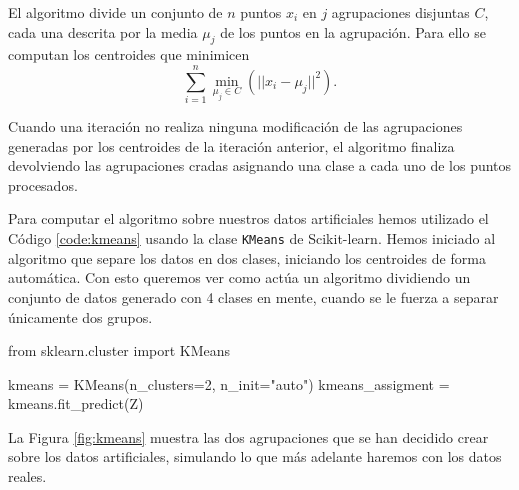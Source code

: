 El algoritmo divide un conjunto de $ n $ puntos $ x_i $ en $ j $ agrupaciones disjuntas $ C $, cada una descrita por la media $ \mu_j $ de los puntos en la agrupación. Para ello se computan los centroides que minimicen
\begin{equation}
  \sum\limits_{i=1}^n \underset{\mu_j \in C}{\operatorname{min}} (|| x_i - \mu_j||^2).
\end{equation}

Cuando una iteración no realiza ninguna modificación de las agrupaciones generadas por los centroides de la iteración anterior, el algoritmo finaliza devolviendo las agrupaciones cradas asignando una clase a cada uno de los puntos procesados.

Para computar el algoritmo sobre nuestros datos artificiales hemos utilizado el Código \ref{code:kmeans} usando la clase \texttt{KMeans} de Scikit-learn. Hemos iniciado al algoritmo que separe los datos en dos clases, iniciando los centroides de forma automática. Con esto queremos ver como actúa un algoritmo dividiendo un conjunto de datos generado con 4 clases en mente, cuando se le fuerza a separar únicamente dos grupos.

\begin{mypython}[float={h}, caption={k-medias.}, label={code:kmeans}]
  from sklearn.cluster import KMeans

  kmeans = KMeans(n_clusters=2, n_init="auto")
  kmeans_assigment = kmeans.fit_predict(Z)
\end{mypython}

La Figura \ref{fig:kmeans} muestra las dos agrupaciones que se han decidido crear sobre los datos artificiales, simulando lo que más adelante haremos con los datos reales.

